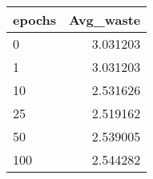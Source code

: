 \begin{tabular}{lr}
\toprule
epochs &  Avg\_waste \\
\midrule
     0 &   3.031203 \\
     1 &   3.031203 \\
    10 &   2.531626 \\
    25 &   2.519162 \\
    50 &   2.539005 \\
   100 &   2.544282 \\
\bottomrule
\end{tabular}
